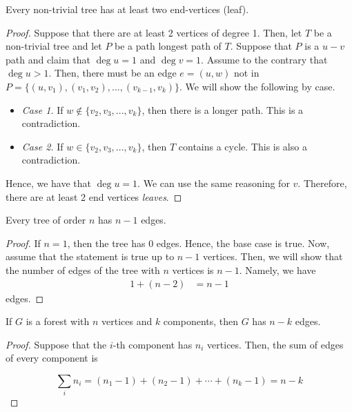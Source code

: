 \begin{theorem}
  Every non-trivial tree has at least two end-vertices (leaf).
\end{theorem}

\begin{proof}
  Suppose that there are at least 2 vertices of degree 1. Then, let \(T\) be a
  non-trivial tree and let \(P\) be a path longest path of \(T\). Suppose that
  \(P\) is a \(u-v\) path and claim that \(\deg u = 1\) and \(\deg v = 1\).
  Assume to the contrary that \(\deg u > 1\). Then, there must be an edge \(e =
  (u, w)\) not in \(P = \{(u, v_1), (v_1, v_2), ..., (v_{k-1}, v_{k})\}\). We
  will show the following by case. 
  \begin{itemize}
    \item \textit{Case 1.} If \(w \notin \{v_2, v_3, ..., v_k\}\), then there is
      a longer path. This is a contradiction.
    \item \textit{Case 2.} If \(w \in \{v_2, v_3, ..., v_{k}\}\), then \(T\)
      contains a cycle. This is also a contradiction.
  \end{itemize}
  Hence, we have that \(\deg u = 1\). We can use the same reasoning for \(v\).
  Therefore, there are at least 2 end vertices \textit{leaves}.
\end{proof}


\begin{theorem}
  Every tree of order \(n\) has \(n-1\) edges.
\end{theorem}

\begin{proof}
  If \(n=1\), then the tree has 0 edges. Hence, the base case is true. Now,
  assume that the statement is true up to \(n-1\) vertices. Then, we will show
  that the number of edges of the tree with \(n\) vertices is \(n-1\). Namely,
  we have 
  \[ 
    \begin{aligned}
      1 + (n-2) &= n-1
    \end{aligned}
  \]
  edges.
\end{proof}

\begin{corollary}
  If \(G\) is a forest with \(n\) vertices and \(k\) components, then \(G\) has
  \(n-k\) edges.
\end{corollary}

\begin{proof}
  Suppose that the \(i\)-th component has \(n_i\) vertices. Then, the sum of
  edges of every component is 

  \begin{displaymath}
    \sum_{i} n_i = (n_1 - 1) + (n_2 - 1) + \cdots + (n_k - 1) = n-k
  \end{displaymath}
\end{proof}


